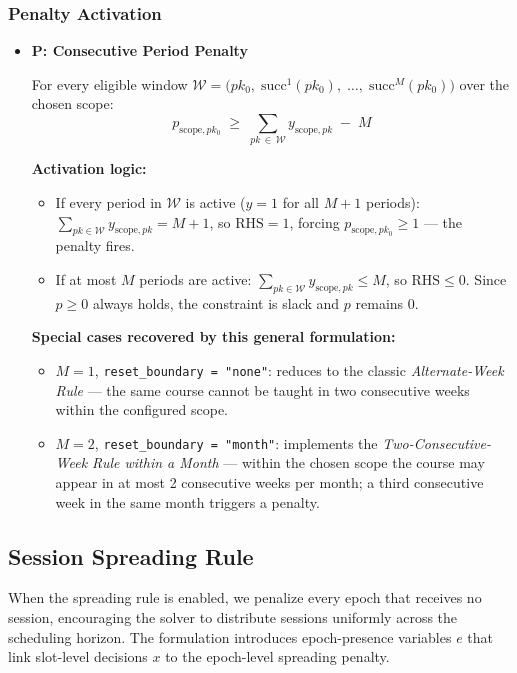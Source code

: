 \documentclass{article}
\begin{document}
\subsubsection*{Penalty Activation}
\begin{itemize}
    \item \textbf{P: Consecutive Period Penalty}

    For every eligible window $\mathcal{W} = \bigl(pk_0,\;\mathrm{succ}^1(pk_0),\;\ldots, \;\mathrm{succ}^M(pk_0)\bigr)$ over the chosen scope:
    \begin{equation}
        p_{\mathrm{scope},pk_0} \;\geq\;
        \sum_{pk\,\in\,\mathcal{W}} y_{\mathrm{scope},pk} \; - \; M
    \end{equation}

    \noindent\textbf{Activation logic:}
    \begin{itemize}
        \item If every period in $\mathcal{W}$ is active ($y = 1$ for all $M+1$ periods): $\displaystyle\sum_{pk \in \mathcal{W}} y_{\mathrm{scope},pk} = M+1$, so $\mathrm{RHS} = 1$, forcing $p_{\mathrm{scope},pk_0} \geq 1$ — the penalty fires.
        \item If at most $M$ periods are active:
              $\displaystyle\sum_{pk \in \mathcal{W}} y_{\mathrm{scope},pk} \leq M$, so $\mathrm{RHS} \leq 0$. Since $p \geq 0$ always holds, the constraint is slack and $p$ remains 0.
    \end{itemize}

    \bigskip
    \noindent\textbf{Special cases recovered by this general formulation:}
    \begin{itemize}
        \item $M = 1$, \texttt{reset\_boundary = "none"}:
              reduces to the classic \emph{Alternate-Week Rule} — the same course cannot be taught in two consecutive weeks within the configured scope.
        \item $M = 2$, \texttt{reset\_boundary = "month"}:
              implements the \emph{Two-Consecutive-Week Rule within a Month} — within the chosen scope the course may appear in at most 2 consecutive weeks per month; a third consecutive week in the same month triggers a penalty.
    \end{itemize}
\end{itemize}

\subsection{Session Spreading Rule}
When the spreading rule is enabled, we penalize every epoch that receives no session,
encouraging the solver to distribute sessions uniformly across the scheduling horizon.
The formulation introduces epoch-presence variables $e$ that link slot-level decisions
$x$ to the epoch-level spreading penalty.
\end{document}
